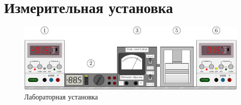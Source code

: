 \documentclass[a4paper,14pt]{extarticle}
\begin{document}
\section{Измерительная установка}

\begin{figure}[h!]
	\centering
	\includegraphics[width=\linewidth]{ris/3b.pdf}
	\vspace{-0.7em}
	\caption{Лабораторная установка}
	\label{fig:figure1}
\end{figure}
\end{document}
